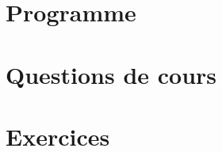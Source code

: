 \documentclass[12pt,french]{report}
\begin{document}
\begin{spacing}{1.2}
\section{Programme}


\section{Questions de cours}



\section{Exercices}
\label{exo1}
\begin{Exercice}[]%





\end{Exercice}

\label{exo2}
\medskip
\begin{Exercice}[]%


\end{Exercice}

\label{exo3}
\medskip
\begin{Exercice}[]%


\end{Exercice}

\label{exo4}
\medskip
\begin{Exercice}[]%



\end{Exercice}
\end{spacing}
\end{document}

